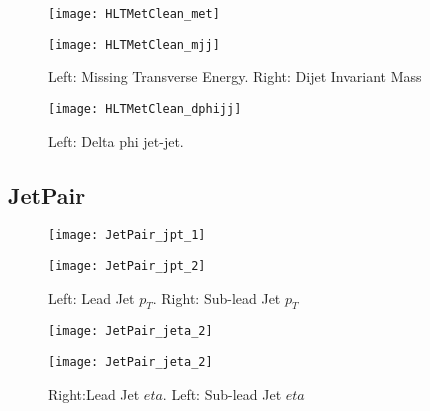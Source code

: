 \documentclass[a4paper,10pt]{article}
\begin{document}
\begin{figure}[!h]
\centering
\begin{minipage}[!h]{0.4\linewidth}
\centering
\texttt{[image: HLTMetClean\_met]}
\end{minipage}%
\begin{minipage}[!h]{0.4\linewidth}
\centering
\texttt{[image: HLTMetClean\_mjj]}
\end{minipage}
\caption{Left: Missing Transverse Energy. Right: Dijet Invariant Mass}
\end{figure}

\begin{figure}[!h]
\centering
\begin{minipage}[!h]{0.4\linewidth}
\centering
\texttt{[image: HLTMetClean\_dphijj]}
\end{minipage}%
\begin{minipage}[!h]{0.4\linewidth}
\centering
\end{minipage}
\caption{Left: Delta phi jet-jet.}
\end{figure}

\clearpage
\subsection{JetPair}  
              
\begin{figure}[!h]
\centering
\begin{minipage}[!h]{0.4\linewidth}
\centering
\texttt{[image: JetPair\_jpt\_1]}
\end{minipage}%
\begin{minipage}[!h]{0.4\linewidth}
  \texttt{[image: JetPair\_jpt\_2]}
\end{minipage}
\caption{Left: Lead Jet $p_T$. Right: Sub-lead Jet $p_T$}
\end{figure}

\begin{figure}[!h]
\centering
\begin{minipage}[!h]{0.4\linewidth}
\centering
\texttt{[image: JetPair\_jeta\_2]}
\end{minipage}%
\begin{minipage}[!h]{0.4\linewidth}
\centering
\texttt{[image: JetPair\_jeta\_2]}
\end{minipage}
\caption{Right:Lead Jet $eta$. Left: Sub-lead Jet $eta$}
\end{figure}
\end{document}
